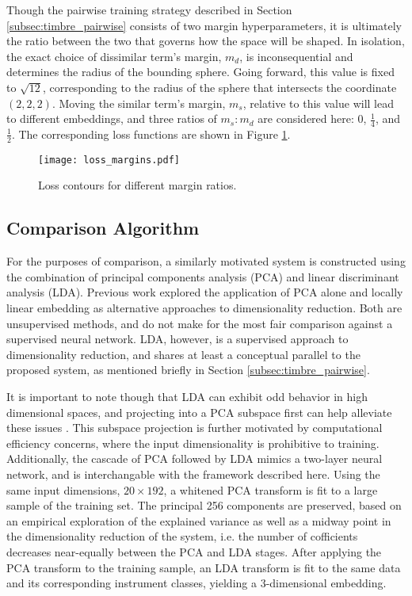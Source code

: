 Though the pairwise training strategy described in Section \ref{subsec:timbre_pairwise} consists of two margin hyperparameters, it is ultimately the ratio between the two that governs how the space will be shaped.
In isolation, the exact choice of dissimilar term's margin, $m_{d}$, is inconsequential and determines the radius of the bounding sphere.
Going forward, this value is fixed to $\sqrt{12}$, corresponding to the radius of the sphere that intersects the coordinate $(2, 2, 2)$.
Moving the similar term's margin, $m_{s}$, relative to this value will lead to different embeddings, and three ratios of $m_{s}:m_{d}$ are considered here: 0, $\frac{1}{4}$, and $\frac{1}{2}$.
The corresponding loss functions are shown in Figure \ref{fig:margins}.


\begin{figure}[h]
\centering
\texttt{[image: loss\_margins.pdf]}
\caption{Loss contours for different margin ratios.}
\label{fig:margins}
\end{figure}



\subsection{Comparison Algorithm}

For the purposes of comparison, a similarly motivated system is constructed using the combination of principal components analysis (PCA) and linear discriminant analysis (LDA).
Previous work explored the application of PCA alone and locally linear embedding as alternative approaches to dimensionality reduction.
Both are unsupervised methods, and do not make for the most fair comparison against a supervised neural network.
LDA, however, is a supervised approach to dimensionality reduction, and shares at least a conceptual parallel to the proposed system, as mentioned briefly in Section \ref{subsec:timbre_pairwise}.

It is important to note though that LDA can exhibit odd behavior in high dimensional spaces, and projecting into a PCA subspace first can help alleviate these issues \cite{PCASubspace?}.
This subspace projection is further motivated by computational efficiency concerns, where the input dimensionality is prohibitive to training.
Additionally, the cascade of PCA followed by LDA mimics a two-layer neural network, and is interchangable with the framework described here.
Using the same input dimensions, $20\times192$, a whitened PCA transform is fit to a large sample of the training set.
The principal 256 components are preserved, based on an empirical exploration of the explained variance as well as a midway point in the dimensionality reduction of the system, i.e. the number of cofficients decreases near-equally between the PCA and LDA stages.
After applying the PCA transform to the training sample, an LDA transform is fit to the same data and its corresponding instrument classes, yielding a 3-dimensional embedding.



